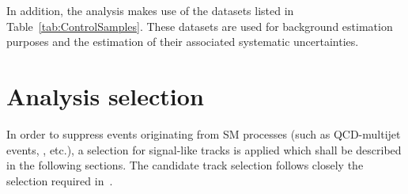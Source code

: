 In addition, the analysis makes use of the datasets listed in Table~\ref{tab:ControlSamples}.
These datasets are used for background estimation purposes and the estimation of their associated systematic uncertainties.
\renewcommand{\arraystretch}{1.5}
\begin{table}[!hbt]
\centering
\caption{Further datasets used for background estimation.}
\label{tab:ControlSamples}
\end{table}  
\section{Analysis selection}
\label{sec:AnalysisSelection}

In order to suppress events originating from SM processes (such as QCD-multijet events, \WJets, etc.), a selection for signal-like tracks is applied which shall be described in the following sections.
The candidate track selection follows closely the selection required in~\cite{bib:CMS:DT_Thesis,bib:CMS:DT_8TeV_AN}.\\

